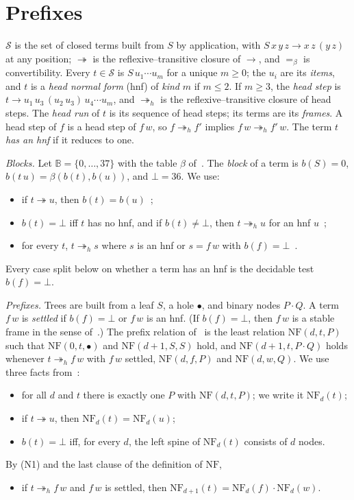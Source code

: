 \documentclass[11pt]{amsart}
\theoremstyle{definition}
\newcommand{\Ter}{\mathcal S}
\newcommand{\red}{\twoheadrightarrow}
\newcommand{\hred}{\twoheadrightarrow_h}
\newcommand{\conv}{=_\beta}
\newcommand{\B}{\mathbb B}
\newcommand{\hole}{\bullet}
\newcommand{\NF}{\mathrm{NF}}
\begin{document}
\section{Prefixes}\label{sec:prefix}

$\Ter$ is the set of closed terms built from $S$ by application, with $S\,x\,y\,z\to x\,z\,(y\,z)$ at
any position; $\red$ is the reflexive--transitive closure of $\to$, and $\conv$ is convertibility.
Every $t\in\Ter$ is $S\,u_1\cdots u_m$ for a unique $m\ge0$; the $u_i$ are its \emph{items}, and $t$ is
a \emph{head normal form} (hnf) of \emph{kind} $m$ if $m\le2$. If $m\ge3$, the \emph{head step} is
$t\to u_1\,u_3\,(u_2\,u_3)\,u_4\cdots u_m$, and $\hred$ is the reflexive--transitive closure of head
steps. The \emph{head run} of $t$ is its sequence of head steps; its terms are its \emph{frames}. A head step of $f$ is a head step of $f\,w$, so $f\hred f'$ implies $f\,w\hred f'\,w$. The term
$t$ \emph{has an hnf} if it reduces to one.

\emph{Blocks.} Let $\B=\{0,\dots,37\}$ with the table $\beta$ of~\citep{s1}. The \emph{block} of a term
is $b(S)=0$, $b(t\,u)=\beta(b(t),b(u))$, and $\bot=36$. We use:
\begin{itemize}
\item[(B1)] if $t\red u$, then $b(t)=b(u)$~\citep[Lemma~3]{s1};
\item[(B2)] $b(t)=\bot$ iff $t$ has no hnf, and if $b(t)\ne\bot$, then $t\hred u$ for an hnf
  $u$~\citep[Proposition~4, and Theorem~9 with its proof]{s1};
\item[(W)] for every $t$, $t\hred s$ where $s$ is an hnf or $s=f\,w$ with
  $b(f)=\bot$~\citep[Theorem~3 and the proof of Proposition~9(b)]{s3}.
\end{itemize}
Every case split below on whether a term has an hnf is the decidable test $b(f)=\bot$.

\emph{Prefixes.} Trees are built from a leaf $S$, a hole $\hole$, and binary nodes $P\cdot Q$. A term
$f\,w$ is \emph{settled} if $b(f)=\bot$ or $f\,w$ is an hnf. (If $b(f)=\bot$, then $f\,w$ is a stable
frame in the sense of~\citep{s6}.) The prefix relation of~\citep[Remark~8]{s3} is the least relation
$\NF(d,t,P)$ such that $\NF(0,t,\hole)$ and $\NF(d+1,S,S)$ hold, and $\NF(d+1,t,P\cdot Q)$ holds
whenever $t\hred f\,w$ with $f\,w$ settled, $\NF(d,f,P)$ and $\NF(d,w,Q)$.
We use three facts from~\citep{s3}:
\begin{itemize}
\item[(N1)] for all $d$ and $t$ there is exactly one $P$ with $\NF(d,t,P)$; we write it $\NF_d(t)$;
\item[(N2)] if $t\red u$, then $\NF_d(t)=\NF_d(u)$;
\item[(N3)] $b(t)=\bot$ iff, for every $d$, the left spine of $\NF_d(t)$ consists of $d$ nodes.
\end{itemize}
By (N1) and the last clause of the definition of $\NF$,
\begin{itemize}
\item[(N4)] if $t\hred f\,w$ and $f\,w$ is settled, then $\NF_{d+1}(t)=\NF_d(f)\cdot\NF_d(w)$.
\end{itemize}
\end{document}
